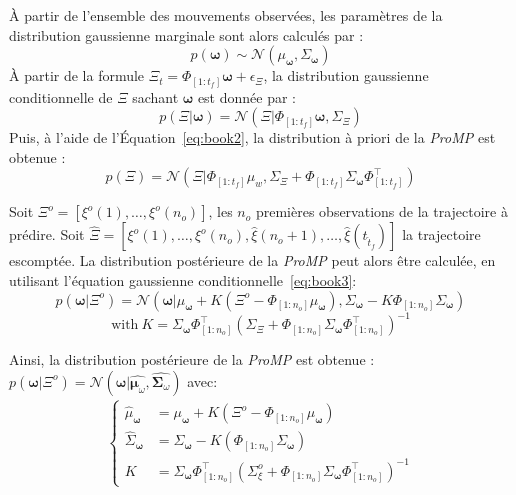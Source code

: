 \documentclass[utf8]{frontiersSCNS} %
\begin{document}
\begin{appendices}
À partir de l'ensemble des mouvements observées, les paramètres de la distribution gaussienne marginale sont alors calculés par :
\begin{equation}
\label{paramdistrib}
  p(\boldsymbol{\omega}) \sim \mathcal{N}(\mu_{\boldsymbol{\omega}}, \Sigma_{\boldsymbol{\omega}})
\end{equation}
À partir de la formule $\Xi_t = \Phi_{[1:t_f]} \boldsymbol{\omega} + \epsilon_\Xi$, la distribution gaussienne conditionnelle de $\Xi$ sachant $\boldsymbol{\omega}$ est donnée par : 
\begin{equation}
p(\Xi | \boldsymbol{\omega}) = \mathcal{N}(\Xi | \Phi_{[1:t_f]} \boldsymbol{\omega}, \Sigma_\Xi)
\end{equation}
Puis, à l'aide de l'Équation~\ref{eq:book2}, la distribution à priori de la \textit{ProMP} est obtenue :
\begin{equation}
\label{eq:marg}
p(\Xi) = \mathcal{N}(\Xi |\Phi_{[1:t_f]} \mu_w, \Sigma_\Xi + \Phi_{[1:t_f]} \Sigma_{\boldsymbol{\omega}} \Phi_{[1:t_f]}^\top ) 
\end{equation}

Soit $\Xi^o=[\xi^o(1),\ldots, \xi^o({n_o})]$,  les $n_o$ premières observations de la trajectoire à prédire.
Soit $\hat{\Xi} = [\xi^o({1}), \ldots, \xi^o({n_o}), \hat{\xi}({n_o+1}), \ldots, \hat{\xi}(t_{\hat{t}_f})]$ la trajectoire escomptée.
La distribution postérieure de la \textit{ProMP} peut alors être calculée, en utilisant l'équation gaussienne conditionnelle~\ref{eq:book3}:
\begin{equation}
\label{eq:cond}
p(\boldsymbol{\omega} | \Xi^o) = \mathcal{N}(\boldsymbol{\omega} | \mu_{\boldsymbol{\omega}} + K(\Xi^o - \Phi_{[1:n_o]} \mu_{\boldsymbol{\omega}}), \Sigma_{\boldsymbol{\omega}} - K \Phi_{[1:n_o]} \Sigma_{\boldsymbol{\omega}}) 
\end{equation}
\begin{equation}
\mathrm{with~} K = \Sigma_{\boldsymbol{\omega}} \Phi_{[1:n_o]}^\top (\Sigma_\Xi + \Phi_{[1:n_o]} \Sigma_{\boldsymbol{\omega}}\Phi_{[1:n_o]}^\top)^{-1}
\end{equation}

Ainsi, la distribution postérieure de la \textit{ProMP} est obtenue : $p(\boldsymbol{\omega} | \Xi^o) = \mathcal{N}(\boldsymbol{\omega} | \hat{\boldsymbol{\mu}_\omega}, \hat{\boldsymbol{\Sigma}_\omega})$ avec:
\begin{eqnarray} 
\left\{
\begin{array}{rl}
\hat{\mu}_{\boldsymbol{\omega}} &= \mu_{\boldsymbol{\omega}} + K(\Xi^o - \Phi_{[1:n_o]} \mu_{\boldsymbol{\omega}}) \\ 
\hat{\Sigma}_{\boldsymbol{\omega}} &= \Sigma_{\boldsymbol{\omega}} - K(\Phi_{[1:n_o]} \Sigma_{\boldsymbol{\omega}}) \\
K&= \Sigma_{\boldsymbol{\omega}}\Phi_{[1:n_o]}^\top(\Sigma_\xi^o + \Phi_{[1:n_o]}\Sigma_{\boldsymbol{\omega}} \Phi_{[1:n_o]}^\top)^{-1}
\end{array}
\right.
\end{eqnarray}



\end{appendices}
\end{document}
